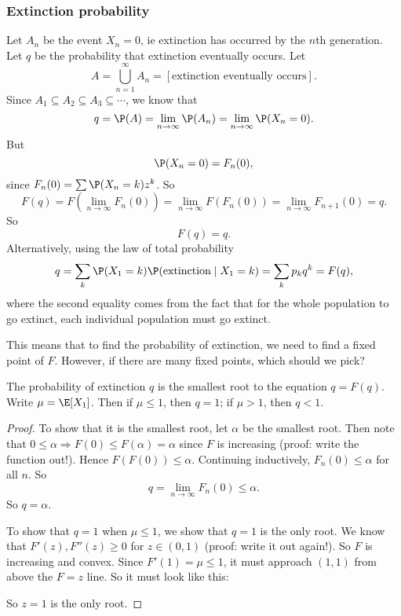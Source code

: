 \documentclass[a4paper]{article}
\begin{document}
\subsubsection*{Extinction probability}
Let $A_n$ be the event $X_n = 0$, ie extinction has occurred by the $n$th generation. Let $q$ be the probability that extinction eventually occurs. Let
\[
  A = \bigcup_{n = 1}^\infty A_n = [\text{extinction eventually occurs}].
\]
Since $A_1 \subseteq A_2 \subseteq A_3 \subseteq \cdots$, we know that
\[
  q = \P(A) = \lim_{n\to \infty} \P(A_n) = \lim_{n \to \infty} \P(X_n = 0).
\]
But
\[
  \P(X_n = 0) = F_n(0),
\]
since $F_n(0) = \sum \P(X_n = k)z^k$. So
\[
  F(q) = F\left(\lim_{n\to \infty} F_n(0)\right) = \lim_{n\to \infty} F(F_n(0)) = \lim_{n\to \infty}F_{n + 1}(0) = q.
\]
So
\[
  F(q) = q.
\]
Alternatively, using the law of total probability
\[
  q = \sum_k \P(X_1 = k) \P(\text{extinction}\mid X_1 = k) = \sum_k p_k q^k = F(q),
\]
where the second equality comes from the fact that for the whole population to go extinct, each individual population must go extinct.

This means that to find the probability of extinction, we need to find a fixed point of $F$. However, if there are many fixed points, which should we pick?

\begin{thm}
  The probability of extinction $q$ is the smallest root to the equation $q = F(q)$. Write $\mu = \E[X_1]$. Then if $\mu \leq 1$, then $q = 1$; if $\mu > 1$, then $q < 1$.
\end{thm}

\begin{proof}
  To show that it is the smallest root, let $\alpha$ be the smallest root. Then note that $0 \leq \alpha \Rightarrow F(0) \leq F(\alpha) = \alpha$ since $F$ is increasing (proof: write the function out!). Hence $F(F(0)) \leq \alpha$. Continuing inductively, $F_n(0) \leq \alpha$ for all $n$. So
  \[
    q = \lim_{n \to \infty}F_n(0) \leq \alpha.
  \]
  So $q = \alpha$.

  To show that $q = 1$ when $\mu \leq 1$, we show that $q = 1$ is the only root. We know that $F'(z), F''(z) \geq 0$ for $z\in (0, 1)$ (proof: write it out again!). So $F$ is increasing and convex. Since $F'(1) = \mu \leq 1$, it must approach $(1, 1)$ from above the $F = z$ line. So it must look like this:
  \begin{center}
  \end{center}
  So $z = 1$ is the only root.
\end{proof}
\end{document}
